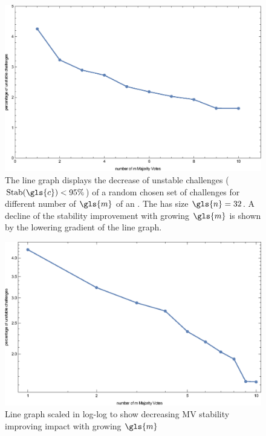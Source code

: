 \begin{figure}[ht]
\includegraphics[width=1.00\textwidth]{images/single-votes-stab-simulation.eps}
\caption{The line graph displays the decrease of unstable challenges ($\Stab(\gls{c}) < 95 \%$) of a random chosen set of challenges for different number of $\gls{m}$ of an \mpuf.
The \mpuf has size $\gls{n} = 32$.
A decline of the stability improvement with growing $\gls{m}$ is shown by the lowering gradient of the line graph.
} 
\label{fig:majorityvotestabilityimprovement}
\end{figure}

\begin{figure}[ht]
\includegraphics[width=1.00\textwidth]{images/single-votes-stab-simulation_loglog.eps}
\caption{Line graph scaled in log-log to show decreasing \ac{MV} stability improving impact with growing $\gls{m}$} 
\label{fig:majorityvotestabilityimprovementloglog}
\end{figure}

